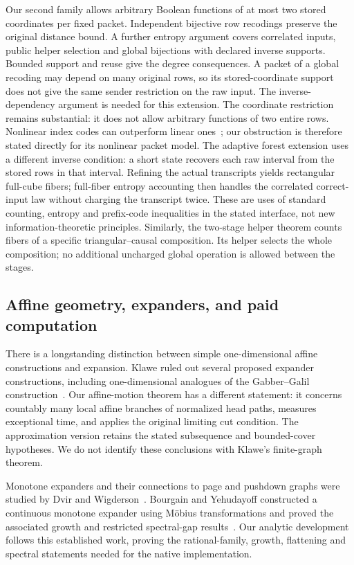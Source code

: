 Our second family allows arbitrary Boolean functions of at most two stored
coordinates per fixed packet. Independent bijective row recodings preserve
the original distance bound. A further entropy argument covers correlated
inputs, public helper selection and global bijections with declared inverse
supports. Bounded support and reuse give the degree consequences. A packet
of a global recoding may depend on
many original rows, so its stored-coordinate support does not give the same
sender restriction on the raw input. The inverse-dependency argument is
needed for this extension. The coordinate restriction remains
substantial: it does not allow arbitrary functions of two entire rows.
Nonlinear index codes can outperform linear ones~\cite{LubetzkyStav2008};
our obstruction is therefore stated directly for its nonlinear packet model.
The adaptive forest extension uses a different inverse condition: a short
state recovers each raw interval from the stored rows in that interval.
Refining the actual transcripts yields rectangular full-cube fibers;
full-fiber entropy accounting then handles the correlated correct-input law
without charging the transcript twice. These are uses of standard counting,
entropy and prefix-code inequalities in the stated interface, not new
information-theoretic principles.
Similarly, the two-stage helper theorem counts fibers of a specific
triangular--causal composition. Its helper selects the whole composition; no additional uncharged
global operation is allowed between the stages.

\subsection{Affine geometry, expanders, and paid computation}

There is a longstanding distinction between simple one-dimensional affine
constructions and expansion. Klawe ruled out several proposed expander
constructions, including one-dimensional analogues of the Gabber--Galil
construction~\cite{Klawe1984}. Our affine-motion theorem has a different
statement: it concerns countably many local affine branches of normalized
head paths, measures exceptional time, and applies the original limiting
cut condition. The approximation version retains the stated subsequence
and bounded-cover hypotheses. We do not identify these conclusions with
Klawe's finite-graph theorem.

Monotone expanders and their connections to page and pushdown graphs were
studied by Dvir and Wigderson~\cite{DvirWigderson2010}.
Bourgain and Yehudayoff constructed a continuous monotone expander using
M\"obius transformations and proved the associated growth and restricted
spectral-gap results~\cite{BourgainYehudayoff2013}. Our analytic development follows this established work, proving the
rational-family, growth, flattening and spectral statements needed for the
native implementation.

